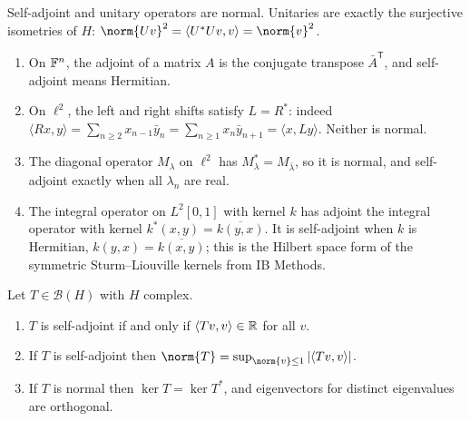 \documentclass[a4paper]{scrartcl}
\newcommand{\ip}[2]{\langle #1, #2 \rangle}
\newcommand{\Bop}{\mathcal{B}}
\begin{document}
Self-adjoint and unitary operators are normal. Unitaries are exactly the surjective isometries of $H$: $\norm{Uv}^2 = \ip{U^*Uv}{v}=\norm{v}^2$.

\begin{example}
	\begin{enumerate}[label=(\roman*)]
		\item On $\mathbb{F}^n$, the adjoint of a matrix $A$ is the conjugate transpose $\bar A^{\mathsf T}$, and self-adjoint means Hermitian.
		\item On $\ell^2$, the left and right shifts satisfy $L = R^*$: indeed $\ip{Rx}{y} = \sum_{n\geq2}x_{n-1}\bar y_n = \sum_{n\geq1}x_n \bar y_{n+1}=\ip{x}{Ly}$. Neither is normal.
		\item The diagonal operator $M_\lambda$ on $\ell^2$ has $M_\lambda^* = M_{\bar\lambda}$, so it is normal, and self-adjoint exactly when all $\lambda_n$ are real.
		\item The integral operator on $L^2[0,1]$ with kernel $k$ has adjoint the integral operator with kernel $k^*(x,y)=\overline{k(y,x)}$. It is self-adjoint when $k$ is Hermitian, $k(y,x)=\overline{k(x,y)}$; this is the Hilbert space form of the symmetric Sturm--Liouville kernels from IB Methods.
	\end{enumerate}
\end{example}

\begin{proposition}
	Let $T \in \Bop(H)$ with $H$ complex.
	\begin{enumerate}[label=(\roman*)]
		\item $T$ is self-adjoint if and only if $\ip{Tv}{v}\in\R$ for all $v$.
		\item If $T$ is self-adjoint then $\norm{T} = \sup_{\norm{v}\leq1}|\ip{Tv}{v}|$.
		\item If $T$ is normal then $\ker T = \ker T^*$, and eigenvectors for distinct eigenvalues are orthogonal.
	\end{enumerate}
\end{proposition}
\end{document}
